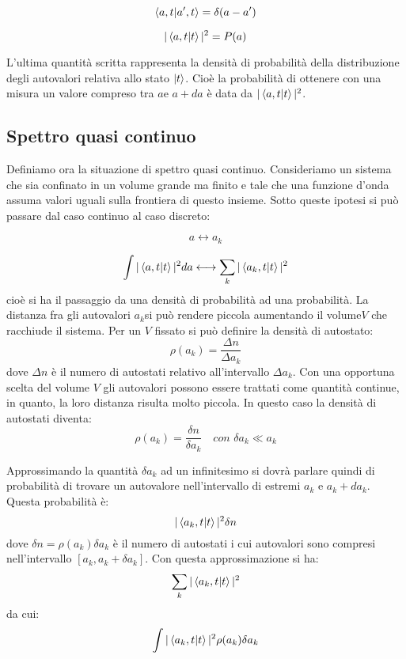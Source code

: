 \begin{equation}
\braket{a,t|a',t}=\delta(a-a')
\end{equation}

\begin{equation}
|\braket{a,t|t}|^2=P(a)
\end{equation}

L'ultima quantità scritta rappresenta la densità di probabilità della 
distribuzione degli autovalori relativa allo stato $\ket{t}$. Cioè la 
probabilità di ottenere con una misura un valore compreso tra $a$e $a+da$ è 
data da $|\braket{a,t|t}|^2$.

\subsection{Spettro quasi continuo}
Definiamo ora la situazione di spettro quasi continuo. Consideriamo un sistema
che sia confinato in un volume grande ma finito e tale che una funzione d'onda
assuma valori uguali sulla frontiera di questo insieme. Sotto queste ipotesi si
può passare dal caso continuo al caso discreto:

\begin{equation}
a \longleftrightarrow a_k
\end{equation}

\begin{equation}
\int|\braket{a,t|t}|^2da \longleftrightarrow \sum_{k}|\braket{a_{k},t|t}|^2
\end{equation}
cioè si ha il passaggio da una densità di probabilità ad una probabilità. La
distanza fra gli autovalori $a_k$si può rendere piccola aumentando il volume$V$
che racchiude il sistema. Per un $V$ fissato si può definire la densità di
autostato:
\begin{equation}
\rho(a_k)=\frac{\Delta n}{\Delta a_{k}}
\end{equation}
dove $\Delta n$ è il numero di autostati relativo all'intervallo $\Delta a_k$.
Con una opportuna scelta del volume $V$ gli autovalori possono essere trattati
come quantità continue, in quanto, la loro distanza risulta molto piccola. In
questo caso la densità di autostati diventa:
\begin{equation}
\rho(a_k)=\frac{\delta n}{\delta a_k}\quad \textit{con }\delta a_k\ll a_k
\end{equation}

Approssimando la quantità $\delta a_k$ ad un infinitesimo si dovrà parlare
quindi di probabilità di trovare un autovalore nell'intervallo di estremi
$a_k$ e $a_k+da_k$. Questa probabilità è:
\begin{equation}
|\braket{a_k,t|t}|^2\delta n
\end{equation}
dove $\delta n= \rho(a_k)\delta a_k$ è il numero di autostati i cui autovalori
sono compresi nell'intervallo $[a_k,a_k+\delta a_k]$. Con questa approssimazione
si ha:
\begin{equation}
\sum_k|\braket{a_k,t|t}|^2
\end{equation}
da cui:
\begin{equation}
\int|\braket{a_k,t|t}|^2\rho(a_k)\delta a_k
\end{equation}

